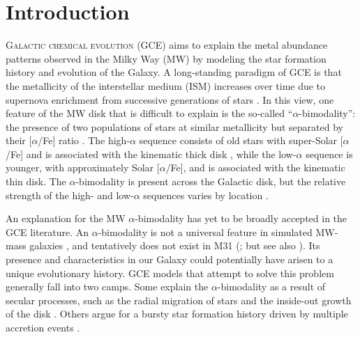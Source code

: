 \documentclass[twocolumn,twocolappendix,linenumbers]{aastex631}
\newcommand{\todo}[1]{{\color{red}#1}}
\newcommand{\aFe}{[$\alpha$/Fe]\xspace}
\begin{document}
\section{Introduction}

\lettrine{G}{alactic chemical evolution} (GCE) aims to explain the metal abundance patterns observed in the Milky Way (MW) by modeling the star formation history and evolution of the Galaxy. A long-standing paradigm of GCE is that the metallicity of the interstellar medium (ISM) increases over time due to supernova enrichment from successive generations of stars \citep[e.g.,][]{tinsley_stellar_1979,matteucci_relative_1986}. In this view, one feature of the MW disk that is difficult to explain is the so-called ``$\alpha$-bimodality'': the presence of two populations of stars at similar metallicity but separated by their \aFe ratio \citep[e.g.,][]{bensby_exploring_2014}. The high-$\alpha$ sequence consists of old stars \citep[$\gtrsim9$ Gyr; e.g.,][]{pinsonneault_apokasc-3_2025} with super-Solar \aFe and is associated with the kinematic thick disk \citep[e.g.,][]{fuhrmann_nearby_1998}, while the low-$\alpha$ sequence is younger, with approximately Solar \aFe, and is associated with the kinematic thin disk. The $\alpha$-bimodality is present across the Galactic disk, but the relative strength of the high- and low-$\alpha$ sequences varies by location \citep{hayden_chemical_2015}. 

An explanation for the MW $\alpha$-bimodality has yet to be broadly accepted in the GCE literature. An $\alpha$-bimodality is not a universal feature in simulated MW-mass galaxies \citep[e.g.,][]{mackereth_origin_2018,parul_effect_2025}, and tentatively does not exist in M31 (\citealt{nidever_prevalence_2024}; but see also \citealt{kobayashi_fe_2023}). Its presence and characteristics in our Galaxy could potentially have arisen to a unique evolutionary history. GCE models that attempt to solve this problem generally fall into two camps. Some explain the $\alpha$-bimodality as a result of secular processes, such as the radial migration of stars and the inside-out growth of the disk \citep[e.g.,][]{schonrich_chemical_2009,kubryk_evolution_2015,sharma_chemical_2021,chen_chemical_2023,prantzos_origin_2023}. Others argue for a bursty star formation history driven by multiple accretion events \citep[e.g.,][]{chiappini_chemical_1997,mackereth_origin_2018,spitoni_beyond_2023}.
\end{document}
